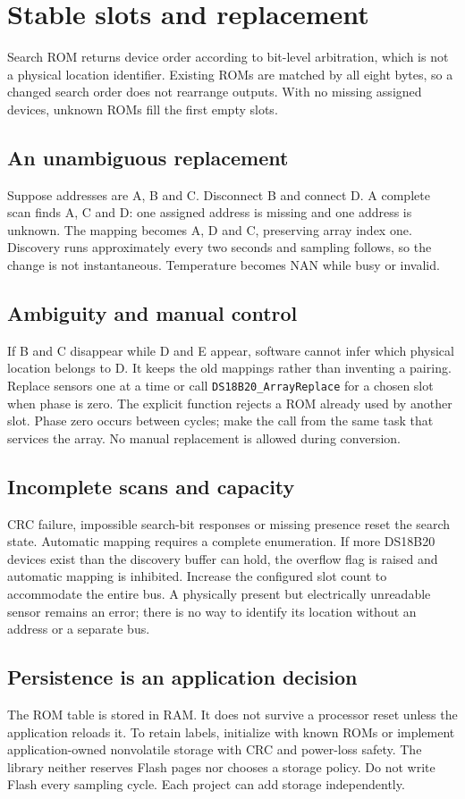 \section{Stable slots and replacement}
Search ROM returns device order according to bit-level arbitration, which is
not a physical location identifier. Existing ROMs are matched by all eight bytes,
so a changed search order does not rearrange outputs. With no missing assigned
devices, unknown ROMs fill the first empty slots.

\subsection{An unambiguous replacement}
Suppose addresses are A, B and C. Disconnect B and connect D. A complete scan
finds A, C and D: one assigned address is missing and one address is unknown.
The mapping becomes A, D and C, preserving array index one. Discovery runs
approximately every two seconds and sampling follows, so the change is not
instantaneous. Temperature becomes NAN while busy or invalid.

\subsection{Ambiguity and manual control}
If B and C disappear while D and E appear, software cannot infer which physical
location belongs to D. It keeps the old mappings rather than inventing a pairing.
Replace sensors one at a time or call \texttt{DS18B20\_ArrayReplace} for a chosen
slot when phase is zero. The explicit function rejects a ROM already used by
another slot. Phase zero occurs between cycles; make the call from the same task
that services the array. No manual replacement is allowed during conversion.

\subsection{Incomplete scans and capacity}
CRC failure, impossible search-bit responses or missing presence reset the search
state. Automatic mapping requires a complete enumeration. If more DS18B20 devices
exist than the discovery buffer can hold, the overflow flag is raised and automatic
mapping is inhibited. Increase the configured slot count to accommodate the entire
bus. A physically present but electrically unreadable sensor remains an error;
there is no way to identify its location without an address or a separate bus.

\subsection{Persistence is an application decision}
The ROM table is stored in RAM. It does not survive a processor reset unless
the application reloads it. To retain labels, initialize with known ROMs or
implement application-owned nonvolatile storage with CRC and power-loss safety.
The library neither reserves Flash pages nor chooses a storage policy. Do not
write Flash every sampling cycle. Each project can add storage independently.
